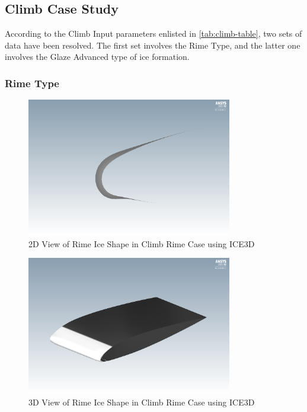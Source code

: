 \documentclass[english]{kththesis}
\begin{document}
\subsection{Climb Case Study}
According to the Climb Input parameters enlisted in \ref{tab:climb-table}, two sets of data have been resolved. The first set involves the Rime Type, and the latter one involves the Glaze Advanced type of ice formation.
\subsubsection{Rime Type}
\begin{figure}[!htb]
    \centering
    \includegraphics[width=0.8\textwidth]{IPS/Ice_Shape_Climb_Rime_2D.png}
    \caption{2D View of Rime Ice Shape in Climb Rime Case using ICE3D}
    \label{fig:Ice_Shape_Climb_Rime_2D.png}
\end{figure}
\begin{figure}[!htb]
    \centering
    \includegraphics[width=0.8\textwidth]{IPS/Ice_Shape_Climb_Rime_3D.png}
    \caption{3D View of Rime Ice Shape in Climb Rime Case using ICE3D}
    \label{fig:Ice_Shape_Climb_Rime_3D.png}
\end{figure}
\end{document}

